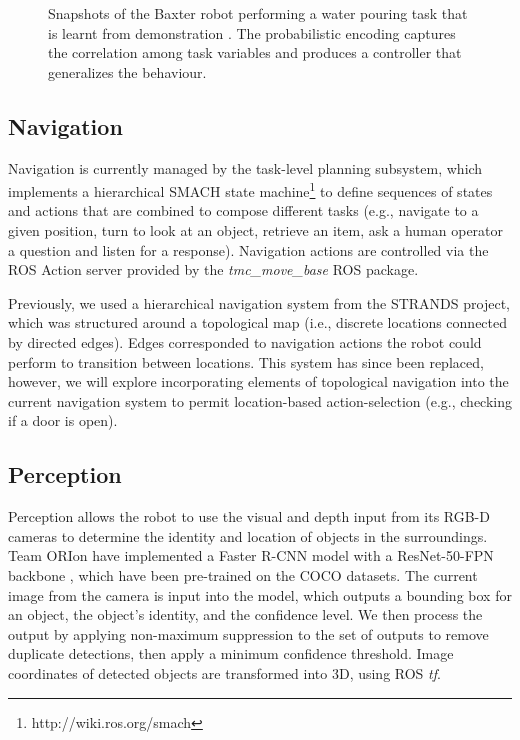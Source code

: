 \documentclass[runningheads,a4paper]{llncs}
\newcommand{\teamori}{Team ORIon}
\begin{document}
\begin{figure}[!t]
	\centering
	\vspace{-10pt}%
	\caption{Snapshots of the Baxter robot performing a water pouring task that
	is learnt from demonstration \cite{Zeestraten2017-RAL}. The probabilistic
	encoding captures the correlation among task variables and produces a
	controller that generalizes the behaviour.}
	\label{fig:baxter_water_task}
	\vspace{-3ex}
\end{figure}


\subsection{Navigation}\label{sec:capability-navigation}
Navigation is currently managed by the task-level planning subsystem, which implements a hierarchical SMACH state machine\footnote{http://wiki.ros.org/smach} to define sequences of states and actions that are combined to compose different tasks (e.g., navigate to a given position, turn to look at an object, retrieve an item, ask a human operator a question and listen for a response). Navigation actions are controlled via the ROS Action server provided by the \emph{tmc\_move\_base} ROS package.

Previously, we used a hierarchical navigation system from the STRANDS project, which was structured around a topological map (i.e., discrete locations connected by directed edges). Edges corresponded to navigation actions the robot could perform to transition between locations. This system has since been replaced, however, we will explore incorporating elements of topological navigation into the current navigation system to permit location-based action-selection (e.g., checking if a door is open).

\subsection{Perception}\label{sec:capability-perception}
Perception allows the robot to use the visual and depth input from its RGB-D cameras to determine the identity and location of objects in the surroundings. \teamori{} have implemented a Faster R-CNN model with a ResNet-50-FPN backbone \cite{ren2015faster}, which have been pre-trained on the COCO datasets. The current image from the camera is input into the model, which outputs a bounding box for an object, the object's identity, and the confidence level. We then process the output by applying non-maximum suppression to the set of outputs to remove duplicate detections, then apply a minimum confidence threshold. Image coordinates of detected objects are transformed into 3D, using ROS \textit{tf}.  
\end{document}
